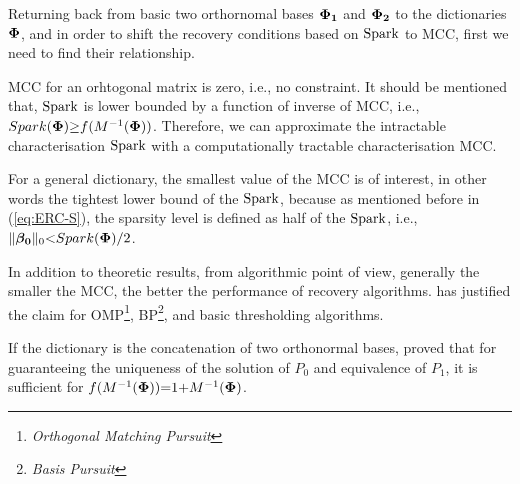 {
\label{Def:M-tilda} 
}


Returning back from basic two orthornomal bases $\boldsymbol{\Phi}_{\boldsymbol{1}}$ and $\boldsymbol{\Phi}_{\boldsymbol{2}}$ to the dictionaries $\boldsymbol{\Phi}$, and in order to shift the recovery conditions based on $\mathrm{Spark}$ to MCC, first we need to find their relationship.

MCC for an orhtogonal matrix is zero, 
i.e., no constraint.
It should be mentioned that, $\mathrm{Spark}$ is lower bounded by a function of inverse of MCC, i.e., $Spark(\boldsymbol{\Phi}) {\geq} f(M^{-1}(\boldsymbol{\Phi}))$. 
Therefore, we can approximate the intractable characterisation $\mathrm{Spark}$ with a computationally tractable characterisation MCC.

For a general dictionary, the smallest value of the MCC is of interest, in other words the tightest lower bound of the $\mathrm{Spark}$, because as mentioned before in (\ref{eq:ERC-S}), the sparsity level is defined as half of the $\mathrm{Spark}$, i.e., $\Vert \boldsymbol{\beta_0} \Vert_0 {<} Spark(\boldsymbol{\Phi})/2$.

In addition to theoretic results, from algorithmic point of view, generally the smaller the MCC, the better the performance of recovery algorithms.
\cite{Foucart2013} has justified the claim for OMP\footnote{\emph{Orthogonal Matching Pursuit}}, BP\footnote{\emph{Basis Pursuit}}, and basic thresholding algorithms. 

If the dictionary is the concatenation of two orthonormal bases, 
\cite{Donoho2001} proved that for guaranteeing the uniqueness of the solution of $P_0$ and equivalence of $P_1$, it is sufficient for $f(M^{-1}(\boldsymbol{\Phi})) {=} 1 {+} M^{-1}(\boldsymbol{\Phi})$.


